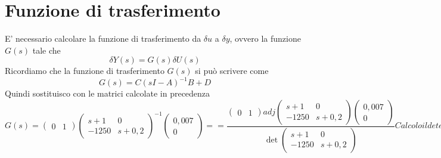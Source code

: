 \documentclass{article}
\begin{document}
\section{Funzione di trasferimento}
E' necessario calcolare la funzione di trasferimento da $\delta u$ a $\delta y$, ovvero la funzione $G(s)$ tale che
\begin{equation}
    \delta Y(s) = G(s)\delta U(s)
\end{equation}
Ricordiamo che la funzione di trasferimento $G(s)$ si può scrivere come
\begin{equation}
    G(s) = C(sI - A)^{-1} B + D
\end{equation}
Quindi sostituisco con le matrici calcolate in precedenza 
\begin{subequations}
\begin{equation}
    G(s)=\begin{pmatrix}
    0 & 1
    \end{pmatrix}
    \begin{pmatrix}
    s+1 & 0 \\
    -1250 & s+0,2
    \end{pmatrix}^{-1}
    \begin{pmatrix}
    0,007 \\
    0
    \end{pmatrix} =
\end{equation}
\begin{equation}
    = \frac{\begin{pmatrix}
    0 & 1
    \end{pmatrix} 
    adj\begin{pmatrix}
         s+1 & 0 \\
    -1250 & s+0,2
    \end{pmatrix}  \begin{pmatrix}
    0,007 \\
    0
    \end{pmatrix}}
    {\det\begin{pmatrix}
        s+1 & 0 \\
    -1250 & s+0,2
    \end{pmatrix}}
\end{equation}
Calcolo il determinante al denominatore
\begin{equation}
    \det\begin{pmatrix}
     s+1 & 0 \\
    -1250 & s+0,2
    \end{pmatrix} = (s+1)(s+0,2)
\end{equation}
Calcolo la matrice aggiunta
\begin{equation}
    adj\begin{pmatrix}
         s+1 & 0 \\
    -1250 & s+0,2
    \end{pmatrix} =
    \begin{pmatrix}
    s+0,2 & 1250 \\
    0 & s+1
    \end{pmatrix}^{T} =
    \begin{pmatrix}
         s+0,2 & 0 \\
         1250 & s+1
    \end{pmatrix}
\end{equation}


\end{subequations}
\end{document}

